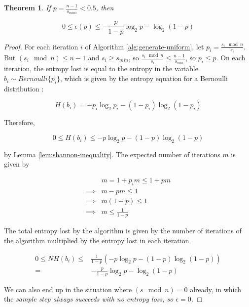 \documentclass[12pt]{article}
\newtheorem{theorem}{Theorem}
\begin{document}
\begin{theorem}
    \label{thm:loss}
If $p = \frac{n-1}{s_{mins}} < 0.5$, then

\begin{equation}
0 \le \epsilon(p) \le -\frac{p}{1-p}\log_2p - \log_2(1-p)
\end{equation}

\end{theorem}

\begin{proof}
For each iteration $i$ of Algorithm \ref{alg:generate-uniform}, let $p_i = \frac{s_i \mod n}{s_i}$. But $(s_i \mod n) \le n-1$ and $s_i \ge s_{min}$, so $\frac{s_i \mod n}{s_i} \le \frac{n-1}{s_{min}}$, so $p_i \le p$. On each iteration, the entropy lost is equal to the entropy in the variable $b_i \sim Bernoulli\{p_i\}$, which is given by the entropy equation for a Bernoulli distribution \cite{cover1999elements}:

\begin{equation}
H(b_i) = -p_i\log_2p_i - (1-p_i)\log_2(1-p_i)
\end{equation}

Therefore, 

\begin{equation}
0 \le H(b_i) \le -p\log_2p - (1-p)\log_2(1-p) 
\end{equation}

by Lemma \ref{lem:shannon-inequality}. The expected number of iterations $m$ is given by

\begin{align}
& m = 1 + p_im \le 1 + pm \\
\implies & m-pm \le 1 \\
\implies & m(1-p) \le 1 \\
\implies & m \le \frac{1}{1-p}
\end{align}

The total entropy lost by the algorithm is given by the number of iterations of the algorithm multiplied by the entropy lost in each iteration.

\begin{align}
0 \le NH(b_i) \le & \frac{1}{1-p}(-p\log_2p - (1-p)\log_2(1-p) ) \\
= & -\frac{p}{1-p}\log_2p - \log_2(1-p)
\end{align}

We can also end up in the situation where $(s \mod n) = 0$ already, in which the \em sample \em step always succeeds with no entropy loss, so $\epsilon=0$.
\end{proof}
\end{document}
